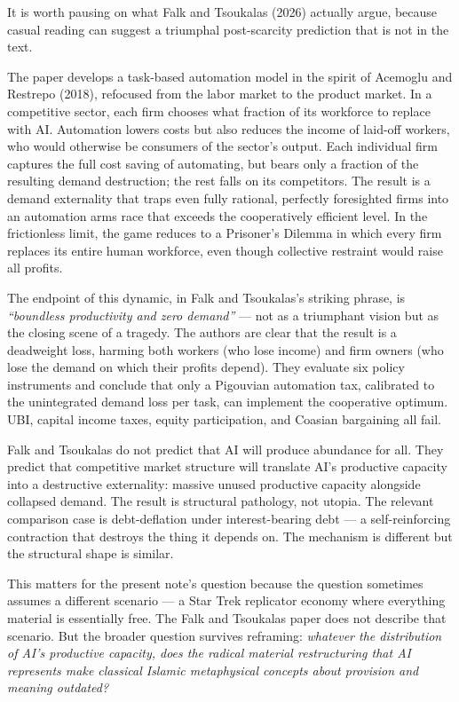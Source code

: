 \documentclass[11pt,a4paper]{article}
\begin{document}
It is worth pausing on what Falk and Tsoukalas (2026) actually
argue, because casual reading can suggest a triumphal post-scarcity
prediction that is not in the text.

The paper develops a task-based automation model in the spirit of
Acemoglu and Restrepo (2018), refocused from the labor market to the
product market. In a competitive sector, each firm chooses what
fraction of its workforce to replace with AI. Automation lowers
costs but also reduces the income of laid-off workers, who would
otherwise be consumers of the sector's output. Each individual
firm captures the full cost saving of automating, but bears only a
fraction of the resulting demand destruction; the rest falls on its
competitors. The result is a demand externality that traps even
fully rational, perfectly foresighted firms into an automation arms
race that exceeds the cooperatively efficient level. In the
frictionless limit, the game reduces to a Prisoner's Dilemma in
which every firm replaces its entire human workforce, even though
collective restraint would raise all profits.

The endpoint of this dynamic, in Falk and Tsoukalas's striking
phrase, is \textit{``boundless productivity and zero demand''} ---
not as a triumphant vision but as the closing scene of a tragedy.
The authors are clear that the result is a deadweight loss, harming
both workers (who lose income) and firm owners (who lose the
demand on which their profits depend). They evaluate six policy
instruments and conclude that only a Pigouvian automation tax,
calibrated to the unintegrated demand loss per task, can implement
the cooperative optimum. UBI, capital income taxes, equity
participation, and Coasian bargaining all fail.

\begin{conceptbox}
Falk and Tsoukalas do not predict that AI will produce abundance for
all. They predict that competitive market structure will translate
AI's productive capacity into a destructive externality: massive
unused productive capacity alongside collapsed demand. The result
is structural pathology, not utopia. The relevant comparison case
is debt-deflation under interest-bearing debt --- a self-reinforcing
contraction that destroys the thing it depends on. The mechanism
is different but the structural shape is similar.
\end{conceptbox}

This matters for the present note's question because the question
sometimes assumes a different scenario --- a Star Trek replicator
economy where everything material is essentially free. The Falk
and Tsoukalas paper does not describe that scenario. But the
broader question survives reframing: \textit{whatever the
distribution of AI's productive capacity, does the radical
material restructuring that AI represents make classical Islamic
metaphysical concepts about provision and meaning outdated?}
\end{document}
